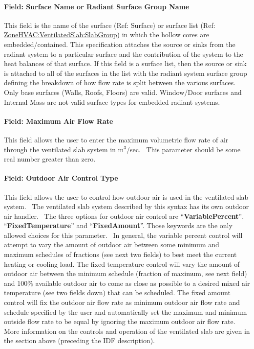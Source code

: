 \paragraph{Field: Surface Name or Radiant Surface Group Name}\label{field-surface-name-or-radiant-surface-group-name-3}

This field is the name of the surface (Ref: Surface) or surface list (Ref: \hyperref[zonehvacventilatedslabslabgroup]{ZoneHVAC:VentilatedSlab:SlabGroup}) in which the hollow cores are embedded/contained. This specification attaches the source or sinks from the radiant system to a particular surface and the contribution of the system to the heat balances of that surface. If this field is a surface list, then the source or sink is attached to all of the surfaces in the list with the radiant system surface group defining the breakdown of how flow rate is split between the various surfaces. Only base surfaces (Walls, Roofs, Floors) are valid. Window/Door surfaces and Internal Mass are not valid surface types for embedded radiant systems.

\paragraph{Field: Maximum Air Flow Rate}\label{field-maximum-air-flow-rate-001}

This field allows the user to enter the maximum volumetric flow rate of air through the ventilated slab system in m\(^{3}\)/sec.~ This parameter should be some real number greater than zero.

\paragraph{Field: Outdoor Air Control Type}\label{field-outdoor-air-control-type}

This field allows the user to control how outdoor air is used in the ventilated slab system.~ The ventilated slab system described by this syntax has its own outdoor air handler.~ The three options for outdoor air control are ``\textbf{VariablePercent}'', ``\textbf{FixedTemperature}'' and ``\textbf{FixedAmount}''. Those keywords are the only allowed choices for this parameter.~ In general, the variable percent control will attempt to vary the amount of outdoor air between some minimum and maximum schedules of fractions (see next two fields) to best meet the current heating or cooling load. The fixed temperature control will vary the amount of outdoor air between the minimum schedule (fraction of maximum, see next field) and 100\% available outdoor air to come as close as possible to a desired mixed air temperature (see two fields down) that can be scheduled. The fixed amount control will fix the outdoor air flow rate as minimum outdoor air flow rate and schedule specified by the user and automatically set the maximum and minimum outside flow rate to be equal by ignoring the maximum outdoor air flow rate. More information on the controls and operation of the ventilated slab are given in the section above (preceding the IDF description).

